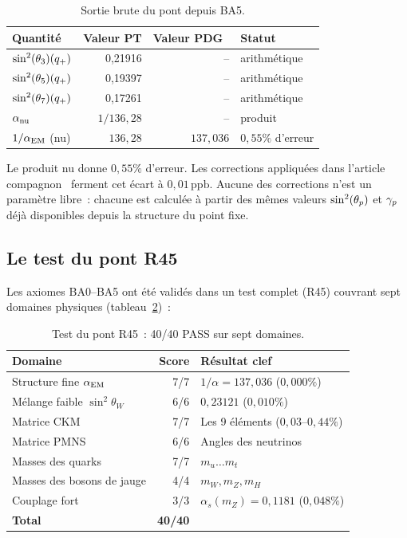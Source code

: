 \documentclass[12pt,a4paper]{article}
\begin{document}
\begin{table}[htbp]
\centering
\caption{Sortie brute du pont depuis BA5.}
\label{tab:bridge_raw}
\begin{tabular}{lrrl}
\toprule
\textbf{Quantité} & \textbf{Valeur PT} & \textbf{Valeur PDG~\cite{PDG2024}} & \textbf{Statut} \\
\midrule
$\sin^2(\theta_{3})(q_{+})$   & 0{,}21916 & -- & arithmétique \\
$\sin^2(\theta_{5})(q_{+})$   & 0{,}19397 & -- & arithmétique \\
$\sin^2(\theta_{7})(q_{+})$   & 0{,}17261 & -- & arithmétique \\
$\alpha_{\rm nu}$  & $1/136{,}28$ & -- & produit \\
$1/\alpha_{\rm EM}$ (nu) & $136{,}28$ & $137{,}036$ & $0{,}55\%$ d'erreur \\
\bottomrule
\end{tabular}
\end{table}

Le produit nu donne $0{,}55\%$ d'erreur. Les corrections appliquées
dans l'article compagnon~\cite{companion_physics} ferment cet
écart à $0{,}01\,\mathrm{ppb}$. Aucune des corrections n'est un
paramètre libre~: chacune est calculée à partir des mêmes valeurs
$\sin^2(\theta_{p})$ et $\gamma_{p}$ déjà disponibles depuis la structure du
point fixe.

\subsection{Le test du pont R45}
\label{sec:ch9_R45}

Les axiomes BA0--BA5 ont été validés dans un test complet (R45)
couvrant sept domaines physiques (tableau~\ref{tab:R45})~:

\begin{table}[htbp]
\centering
\caption{Test du pont R45~: 40/40 PASS sur sept domaines.}
\label{tab:R45}
\begin{tabular}{lrl}
\toprule
\textbf{Domaine} & \textbf{Score} & \textbf{Résultat clef} \\
\midrule
Structure fine $\alpha_{\rm EM}$ & 7/7 & $1/\alpha = 137{,}036$ ($0{,}000\%$) \\
Mélange faible $\sin^2\theta_W$ & 6/6 & $0{,}23121$ ($0{,}010\%$) \\
Matrice CKM & 7/7 & Les 9 éléments ($0{,}03\text{--}0{,}44\%$) \\
Matrice PMNS & 6/6 & Angles des neutrinos \\
Masses des quarks & 7/7 & $m_u\ldots m_t$ \\
Masses des bosons de jauge & 4/4 & $m_W, m_Z, m_H$ \\
Couplage fort & 3/3 & $\alpha_s(m_Z) = 0{,}1181$ ($0{,}048\%$) \\
\midrule
\textbf{Total} & \textbf{40/40} & \\
\bottomrule
\end{tabular}
\end{table}
\end{document}
